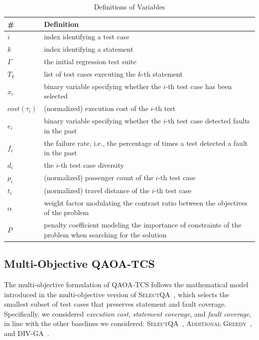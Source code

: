 \begin{table}[ht]
\caption{Definitions of Variables}
\label{tab:1}       %
\begin{tabularx}{\linewidth}{lX}
\hline
\textbf{\#} & \textbf{Definition} \\
\hline
$i$ & index identifying a test case \\
$k$ & index identifying a statement \\
$\Gamma$ & the initial regression test suite \\
$T_k$ & list of test cases executing the $k$-th statement \\
$x_i$ & binary variable specifying whether the $i$-th test case has been selected \\
$cost(\tau_i)$ & (normalized) execution cost of the $i$-th test \\
$e_i$ & binary variable specifying whether the $i$-th test case detected faults in the past \\
$f_i$ & the failure rate, i.e., the percentage of times a test detected a fault in the past \\
$d_i$ & the $i$-th test case diversity \\
$p_i$ & (normalized) passenger count of the $i$-th test case \\
$t_i$ & (normalized) travel distance of the $i$-th test case \\
$\alpha$ & weight factor modulating the contrast ratio between the objectives of the problem \\
$P$ & penalty coefficient modeling the importance of constraints of the problem when searching for the solution \\
\hline
\end{tabularx}
\end{table}

\subsection{Multi-Objective QAOA-TCS}
\label{sec:3.1.1}
The multi-objective formulation of \textsc{QAOA-TCS} follows the mathematical model introduced in the multi-objective version of \textsc{SelectQA}~\citep{selectqa}, which selects the smallest subset of test cases that preserves statement and fault coverage. Specifically, we considered \emph{execution cost}, \emph{statement coverage}, and \emph{fault coverage}, in line with the other baselines we considered: \textsc{SelectQA}~\citep{selectqa}, \textsc{Additional Greedy}~\citep{yoo2007pareto}, and \textsc{DIV-GA}~\citep{panichella2014improving}.  

